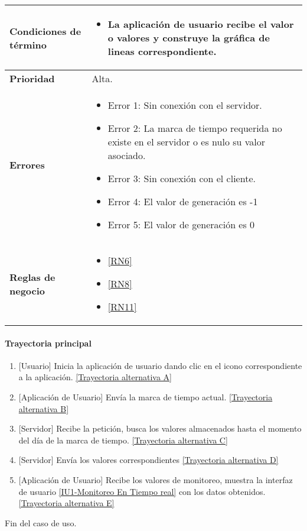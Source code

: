 \begin{longtable}{|J{5cm}|J{10.3cm}|}
	\textbf{Condiciones de término} & 
		\begin{itemize}
			\item La aplicación de usuario recibe el valor o valores y construye la gráfica de lineas correspondiente.
		\end{itemize} \\ \hline 
	\textbf{Prioridad} & 
		Alta. \\ \hline
	\textbf{Errores} & 
		\begin{itemize}
		    \item \label{CU5:Error1} Error 1: Sin conexión con el servidor.
			\item \label{CU5:Error2} Error 2: La marca de tiempo requerida no existe en el servidor o es nulo su valor asociado.
		    \item \label{CU5:Error3} Error 3: Sin conexión con el cliente.
		    \item \label{CU5:Error4} Error 4: El valor de generación es -1
		    \item \label{CU5:Error5} Error 5: El valor de generación es 0
		\end{itemize} \\ \hline
	\textbf{Reglas de negocio} & 
		\begin{itemize}
		    \item \ref{RN6}
			\item \ref{RN8}
			\item \ref{RN11}
		\end{itemize} \\ \hline
\end{longtable}

\paragraph{Trayectoria principal}
    \label{SUB-U-CU1.5:TP}
	\begin{enumerate}
	    \item {[Usuario]} Inicia la aplicación de usuario dando clic en el icono correspondiente a la aplicación. \hyperref[SUB-U-CU1.5:TA]{[Trayectoria alternativa A]}
	    \item {[Aplicación de Usuario]} Envía la marca de tiempo actual. \hyperref[SUB-U-CU1.5:TB]{[Trayectoria alternativa B]} 
	    \item {[Servidor]} Recibe la petición, busca los valores almacenados hasta el momento del día de la marca de tiempo. \hyperref[SUB-U-CU1.5:TC]{[Trayectoria alternativa C]}
	    \item {[Servidor]} Envía los valores correspondientes \hyperref[SUB-U-CU1.5:TD]{[Trayectoria alternativa D]} 
	    \item {[Aplicación de Usuario]} Recibe los valores de monitoreo, muestra la interfaz de usuario \hyperref[fig:monitoreo]{[IU1-Monitoreo En Tiempo real]} con los datos obtenidos. \hyperref[SUB-U-CU1.5:TE]{[Trayectoria alternativa E]}
	\end{enumerate}
	Fin del caso de uso.

